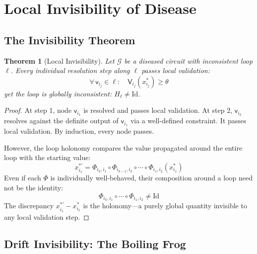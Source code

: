 \documentclass[10pt,twocolumn,a4paper]{article}
\theoremstyle{plain}
\newtheorem{theorem}{Theorem}[section]
\theoremstyle{definition}
\theoremstyle{remark}
\newcommand{\fnode}{\mathsf{v}}
\newcommand{\circuit}{\mathcal{G}}
\newcommand{\valid}{\mathsf{V}}
\begin{document}
\section{Local Invisibility of Disease}
\label{sec:invisibility}

\subsection{The Invisibility Theorem}

\begin{theorem}[Local Invisibility]
\label{thm:local_invisibility}
Let $\circuit$ be a diseased circuit with inconsistent loop $\ell$. Every individual resolution step along $\ell$ passes local validation:
\begin{equation}
    \forall\, \fnode_{i_j} \in \ell: \quad \valid_{i_j}(x_{i_j}^*) \geq \theta
\end{equation}
yet the loop is globally inconsistent: $H_\ell \neq \mathrm{Id}$.
\end{theorem}

\begin{proof}
At step 1, node $\fnode_{i_1}$ is resolved and passes local validation. At step 2, $\fnode_{i_2}$ resolves against the definite output of $\fnode_{i_1}$ via a well-defined constraint. It passes local validation. By induction, every node passes.

However, the loop holonomy compares the value propagated around the entire loop with the starting value:
\begin{equation}
    x_{i_1}^{*\prime} = \Phi_{i_k, i_1} \circ \Phi_{i_{k-1}, i_k} \circ \cdots \circ \Phi_{i_1, i_2}(x_{i_1}^*)
\end{equation}
Even if each $\Phi$ is individually well-behaved, their composition around a loop need not be the identity:
\begin{equation}
    \Phi_{i_k, i_1} \circ \cdots \circ \Phi_{i_1, i_2} \neq \mathrm{Id}
\end{equation}
The discrepancy $x_{i_1}^{*\prime} - x_{i_1}^*$ is the holonomy---a purely global quantity invisible to any local validation step.
\end{proof}

\subsection{Drift Invisibility: The Boiling Frog}
\end{document}

